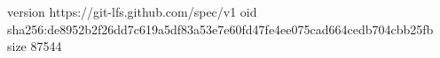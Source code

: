 version https://git-lfs.github.com/spec/v1
oid sha256:de8952b2f26dd7c619a5df83a53e7e60fd47fe4ee075cad664cedb704cbb25fb
size 87544
